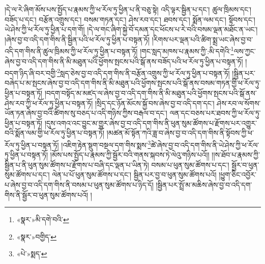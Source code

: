 །དེ་ལ་རེ་ཞིག་མོས་པས་སྤྱོད་པ་རྣམས་ཀྱི་ཕ་རོལ་ཏུ་ཕྱིན་པ་ནི་བཅུ་སྟེ། འདི་ལྟར་སྦྱིན་པ་དང་། ཚུལ་ཁྲིམས་དང་། བཟོད་པ་དང་། བརྩོན་འགྲུས་དང་། བསམ་གཏན་དང་། ཤེས་རབ་དང་། ཐབས་དང་། སྨོན་ལམ་དང་། སྟོབས་དང་། ཡེ་ཤེས་ཀྱི་ཕ་རོལ་ཏུ་ཕྱིན་པ་དག་གོ། །དེ་ལ་གང་ཞིག་སྐྱེ་བོ་དམན་དང་ཕོངས་པ་རེ་བའི་བསམ་ལྡན་མཐོང་ན་ཡང་། །ཞེས་བྱ་བ་འདི་དག་གིས་ནི་སྦྱིན་པའི་ཕ་རོལ་ཏུ་ཕྱིན་པ་བསྟན་ཏོ། །རིགས་པར་ལྡན་པའི་ཚིག་སྨྲ་ཡང་ཞེས་བྱ་བ་འདི་དག་གིས་ནི་ཚུལ་ཁྲིམས་ཀྱི་ཕ་རོལ་ཏུ་ཕྱིན་པ་བསྟན་ཏོ། །གང་སླད་མཁས་པ་རྣམས་ཀྱི་:མི་དགེའི་\footnote{«སྣར་»མི་དགེ་བའི་}ལས་ཀྱང་ཞེས་བྱ་བ་འདི་དག་གིས་ནི་མི་མཐུན་པའི་ཕྱོགས་སྤངས་པའི་སྒོ་ནས་བཟོད་པའི་ཕ་རོལ་ཏུ་ཕྱིན་པ་བསྟན་ཏོ། །བདག་ཉིད་ཞི་བར་བགྱི་\footnote{«སྣར་»བགྱིད་}སླད་ཅེས་བྱ་བ་འདི་དག་གིས་ནི་བརྩོན་འགྲུས་ཀྱི་ཕ་རོལ་ཏུ་ཕྱིན་པ་བསྟན་ཏོ། །སྦྱིན་པར་བཞེད་པ་མ་སྤངས་ཞེས་བྱ་བ་འདི་དག་གིས་ནི་མི་མཐུན་པའི་ཕྱོགས་སྤངས་པའི་སྒོ་ནས་བསམ་གཏན་གྱི་ཕ་རོལ་ཏུ་ཕྱིན་པ་བསྟན་ཏོ། །བདག་བསྟོད་མ་མཛད་ལ་ཞེས་བྱ་བ་འདི་དག་གིས་ནི་མི་མཐུན་པའི་ཕྱོགས་སྤངས་པའི་སྒོ་ནས་ཤེས་རབ་ཀྱི་ཕ་རོལ་ཏུ་ཕྱིན་པ་བསྟན་ཏོ། །སྲིད་དང་ཉོན་མོངས་སྐྱོ་བས་ཞེས་བྱ་བ་འདི་དག་དང་། ཤེས་རབ་ལ་སོགས་ཡོན་ཏན་ཞེས་བྱ་བའི་ཚིགས་སུ་བཅད་པ་འདི་གཉིས་ཀྱིས་བརྒལ་བ་དང་། ལན་དང་བཅས་པར་ཐབས་ཀྱི་ཕ་རོལ་ཏུ་ཕྱིན་པ་བསྟན་ཏོ། །དུས་འགའ་འང་བྱུང་མ་གྱུར་ཞེས་བྱ་བ་འདི་དག་གིས་ནི་ཕུན་སུམ་ཚོགས་པ་རྫོགས་པར་འགྱུར་བའི་སྨོན་ལམ་གྱི་ཕ་རོལ་ཏུ་ཕྱིན་པ་བསྟན་ཏོ། །མཚན་མོ་སྟོན་ཀའི་ཟླ་བ་ཞེས་བྱ་བ་འདི་དག་གིས་ནི་སྟོབས་ཀྱི་ཕ་རོལ་ཏུ་ཕྱིན་པ་བསྟན་ཏོ། །འཇིག་རྟེན་སྡུག་བསྔལ་དག་གིས་སྨས་\footnote{«པེ་»སྨད་}ཚེ་ཞེས་བྱ་བ་འདི་དག་གིས་ནི་ཡེ་ཤེས་ཀྱི་ཕ་རོལ་ཏུ་ཕྱིན་པ་བསྟན་ཏོ། །མོས་པས་སྤྱོད་པ་རྣམས་ཀྱི་སྦྱོར་བའི་གནས་སྐབས་ཏེ་ལེའུ་གཉིས་པའོ།། །།ས་ཐོབ་པ་རྣམས་ཀྱི་སྦྱིན་པ་ནི་ཕུན་སུམ་ཚོགས་པ་རྫོགས་པ་བཞི་དང་ལྡན་པ་ཡིན་ཏེ། བསམ་པ་ཕུན་སུམ་ཚོགས་པ་དང་། སྦྱོར་བ་ཕུན་སུམ་ཚོགས་པ་དང་། ལེན་པ་པོ་ཕུན་སུམ་ཚོགས་པ་དང་། སྦྱིན་པར་བྱ་བ་ཕུན་སུམ་ཚོགས་པའོ། །ཕྱུག་ཅིང་འབྱོར་པ་ཞེས་བྱ་བ་འདི་དག་གིས་ནི་བསམ་པ་ཕུན་སུམ་ཚོགས་པ་ཉིད་དོ། །སྦྱིན་པར་སྤྲོ་མ་མཆིས་ཞེས་བྱ་བ་འདི་དག་གིས་ནི་སྦྱོར་བ་ཕུན་སུམ་ཚོགས་པའོ། །
